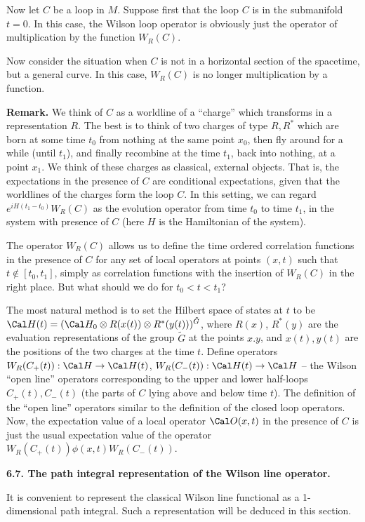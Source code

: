 Now let $C$ be a loop in $M$. 
Suppose first that the loop $C$ is in the submanifold 
$t=0$. In this case, the Wilson loop operator is obviously just 
the operator of multiplication by the function $W_R(C)$. 

Now consider the situation when $C$ is not in a horizontal section 
of the spacetime, but a general curve. In this case, $W_R(C)$ 
is no longer multiplication by a function.

  {\bf Remark. } 
We think of $C$ as a worldline of a ``charge'' 
which transforms in a representation $R$. The best is to think 
of two charges of type $R,R^*$ which are born at some time $t_0$ from nothing 
at the same point $x_0$, then fly around for a while (until $t_1$), and finally
recombine at the time $t_1$, back into nothing, at a point $x_1$. 
We think of these charges as classical, external objects. That is,
the expectations in the presence of $C$ are conditional 
expectations, given that the worldlines of the charges form the loop $C$. 
In this setting, we can regard $e^{iH(t_1-t_0)}W_R(C)$ 
as the evolution operator from time $t_0$ to time $t_1$, in the 
system with presence of $C$ (here $H$ is the Hamiltonian 
of the system). 

The operator $W_R(C)$ allows us to define the time ordered correlation
functions in the presence of $C$ for any set of local operators at points 
$(x,t)$ such that $t\notin [t_0,t_1]$, simply as correlation functions with 
the insertion of $W_R(C)$ in the right place. 
But what should we do for $t_0<t<t_1$? 

The most natural method is to set the Hilbert space of states 
at $t$ to be $\Cal H(t)=(\Cal H_0\o R(x(t))\o R^*(y(t)))^{\tilde G}$,
where $R(x)$, $R^*(y)$ are the evaluation representations of the group 
$\tilde G$ at the points $x.y$, and $x(t),y(t)$ are the positions
of the two charges at the time $t$. 
Define operators $W_R(C_+(t)): \Cal H\to \Cal H(t)$, $W_R(C_-(t)): 
\Cal H(t)\to \Cal H$ 
-- the Wilson ``open line'' operators corresponding to the upper and lower
half-loops $C_+(t),C_-(t)$ (the parts of $C$ lying above and below time $t$). 
The definition of the ``open line'' operators similar to the definition 
of the closed loop operators. 
Now, the expectation value of
a local operator $\O(x,t)$ in the presence of $C$ is just the usual 
expectation value of the operator $W_R(C_+(t))\phi(x,t)W_R(C_-(t))$.

{\bf 6.7. The path integral representation of the Wilson line operator.}

It is convenient to represent the classical Wilson line functional 
as a 1-dimensional path integral. Such a representation
 will be deduced in this section. 

